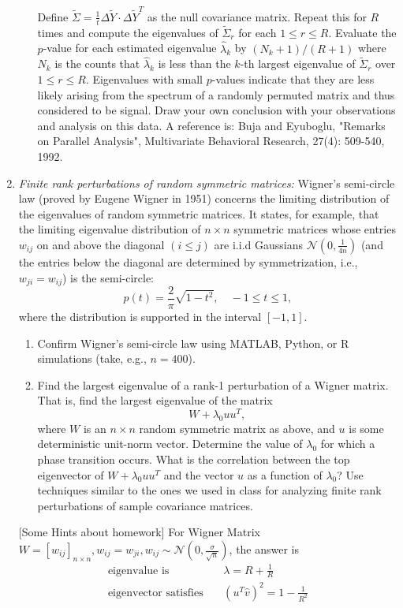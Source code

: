 \documentclass[11pt]{article}
\begin{document}
\begin{enumerate}
\begin{enumerate}
\[\]
Define $\tilde{\Sigma} = \frac{1}{t} \Delta \tilde{Y} \cdot \Delta \tilde{Y}^T$ as the null covariance matrix. Repeat this for $R$ times and compute the eigenvalues of $\tilde{\Sigma}_r$ for each $1\leq r\leq R$. Evaluate the $p$-value for each estimated eigenvalue $\hat{\lambda}_k$ by $(N_k + 1)/(R+1)$ where $N_k$ is the counts that $\hat{\lambda}_k$ is less than the $k$-th largest eigenvalue of $\tilde{\Sigma}_r$ over $1\leq r \leq R$. Eigenvalues with small $p$-values indicate that they are less likely arising from the spectrum of a randomly permuted matrix and thus considered to be signal. Draw your own conclusion with your observations and analysis on this data. A reference is: Buja and Eyuboglu, "Remarks on Parallel Analysis", Multivariate Behavioral Research, 27(4): 509-540, 1992.
\end{enumerate}

\item {\em Finite rank perturbations of random symmetric matrices:} Wigner's semi-circle law (proved by Eugene Wigner in 1951) concerns the limiting distribution of the eigenvalues of random symmetric matrices. It states, for example, that the limiting eigenvalue distribution of $n\times n$ symmetric matrices whose entries $w_{ij}$ on and above the diagonal $(i\leq j)$ are i.i.d Gaussians $\mathcal{N}(0,\frac{1}{4n})$ (and the entries below the diagonal are determined by symmetrization, i.e., $w_{ji}=w_{ij}$) is the semi-circle:
    $$p(t) = \frac{2}{\pi} \sqrt{1-t^2}, \quad -1\leq t \leq 1,$$
    where the distribution is supported in the interval $[-1,1]$.
\begin{enumerate}
\item Confirm Wigner's semi-circle law using MATLAB, Python, or R simulations (take, e.g., $n=400$).
\item Find the largest eigenvalue of a rank-1 perturbation of a Wigner matrix. That is, find the largest eigenvalue of the matrix $$W + \lambda_0 uu^T,$$ where $W$ is an $n\times n$ random symmetric matrix as above, and $u$ is some deterministic unit-norm vector. Determine the value of $\lambda_0$ for which a phase transition occurs. What is the correlation between the top eigenvector of $W+\lambda_0 uu^T$ and the vector $u$ as a function of $\lambda_0$? Use techniques similar to the ones we used in class for analyzing finite rank perturbations of sample covariance matrices.
\end{enumerate} 

[Some Hints about homework] For Wigner Matrix\ $W=[w_{ij}]_{n\times n},w_{ij}=w_{ji},w_{ij}\sim {\mathcal N}(0,\frac{\sigma}{\sqrt{n}})$, 
 the answer is
$$
\begin{array}{rcl}
\textrm{eigenvalue\ is}\ & &\lambda=R+\frac{1}{R}\\
\textrm{eigenvector\ satisfies}\ && (u^{T}\hat{v})^{2}=1-\frac{1}{R^{2}} \\
\end{array}
$$



\end{enumerate}
\end{document}
